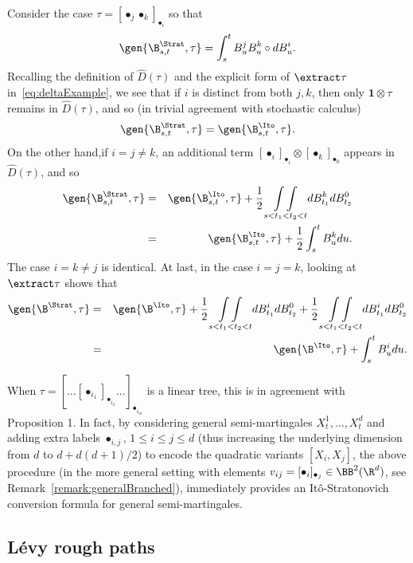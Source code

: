 \documentclass{article}
\begin{document}
\begin{example}
Consider the case $\tau =[\bullet_j \bullet_k]_{\bullet_i}$ so that%
\[
\gen{\B^\Strat_{s,t},\tau} =\int_{s}^{t} B_{u}^{j}B_{u}^{k}\circ dB_{u}^{i}.
\]
Recalling the definition of $\hat D(\tau)$ and the explicit form of $\extract \tau$ in~\eqref{eq:deltaExample}, we see that if $i$ is distinct from both $j,k$, then only $\mathbf{1}\otimes \tau$ remains in $\hat D(\tau)$, and so (in trivial agreement with stochastic calculus)
\[
\gen{\B^\Strat_{s,t},\tau} = \gen{\B^\Ito_{s,t},\tau}.
\]
On the other hand,if $i=j\neq k$, an
additional term $[\bullet_i]_{\bullet_i} \otimes [\bullet_k]_{\bullet_0}$ appears in $\hat D(\tau)$, and so
\begin{eqnarray*}
\gen{ \B^\Strat_{s,t},\tau} &=& \gen{\B^\Ito_{s,t},\tau} +\frac{1}{2} \underset{s<t_{1}<t_{2}<t}{\int \int }%
dB_{t_{1}}^{k}dB_{t_{2}}^{0} \\
&=&\gen{\B^\Ito_{s,t},\tau}  +\frac{1}{2}%
\int_{s}^{t} B_{u}^{k} du.
\end{eqnarray*}%
The case $i=k\neq j$ is identical. At last, in the case $i=j=k$, looking at $\extract \tau $ shows that
\begin{eqnarray*}
\gen{\B^\Strat,\tau }  &=& \gen{\B^\Ito,\tau } +\frac{1}{2}\underset{s<t_{1}<t_{2}<t}{\int \int } dB_{t_{1}}^{i}dB_{t_{2}}^{0}+\frac{1}{2}\underset{s<t_{1}<t_{2}<t}{\int \int 
}dB_{t_{1}}^{i}dB_{t_{2}}^{0} \\
&=& \gen{ \B^\Ito,\tau } +\int_{s}^{t} B_{u}^{i} du.
\end{eqnarray*}
\end{example}

\begin{remark}
When $\tau = [\ldots [\bullet_{i_1}]_{\bullet_{i_2}}\ldots ]_{\bullet_{i_m}}$ is a linear tree, this is in agreement with~\cite{BenArous89} Proposition 1. In fact, by considering general semi-martingales $X^1_t,\ldots, X^d_t$ and adding extra labels $\bullet_{i,j}$, $1 \leq i \leq j \leq d$ (thus increasing the underlying dimension from $d$ to $d + d(d+1)/2$) to encode the quadratic variants $[X_i,X_j]$, the above procedure (in the more general setting with elements $v_{ij} = [\bullet_i]_{\bullet_j} \in \BB^2(\R^d)$, see Remark~\ref{remark:generalBranched}), immediately provides an It{\^o}-Stratonovich conversion formula for general semi-martingales.
\end{remark}

\subsection{L\'evy rough paths} \label{sec:levy}
\end{document}

